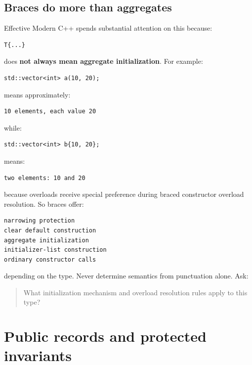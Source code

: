 \subsection{Braces do more than aggregates}\label{05-engine-i-ch003-braces-do-more-than-aggregates}

\hypertarget{05-engine-i-ch003-braces-do-more-than-aggregates}{}

Effective Modern C++ spends substantial attention on this because:

\begin{verbatim}
T{...}
\end{verbatim}

does \textbf{not always mean aggregate initialization}. For example:

\begin{verbatim}
std::vector<int> a(10, 20);
\end{verbatim}

means approximately:

\begin{verbatim}
10 elements, each value 20
\end{verbatim}

while:

\begin{verbatim}
std::vector<int> b{10, 20};
\end{verbatim}

means:

\begin{verbatim}
two elements: 10 and 20
\end{verbatim}

because  overloads receive special preference during braced constructor overload resolution. So braces offer:

\begin{verbatim}
narrowing protection
clear default construction
aggregate initialization
initializer-list construction
ordinary constructor calls
\end{verbatim}

depending on the type. Never determine semantics from punctuation alone. Ask:

\begin{quote}
What initialization mechanism and overload resolution rules apply to this type?
\end{quote}

\section{Public records and protected invariants}\label{05-engine-i-ch003-public-records-and-protected-invariants}

